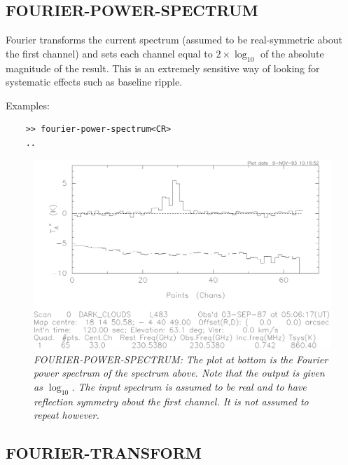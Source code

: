 \documentclass[11pt,twoside]{report}
\begin{document}
\subsection{FOURIER-POWER-SPECTRUM} 

Fourier transforms the current spectrum (assumed to be real-symmetric about
the first channel) and sets each channel equal to $2\times\log_{10}$ of the
absolute magnitude of the result. This is an extremely sensitive
way of looking for systematic effects such as baseline ripple.

Examples:
\begin{verbatim}
    >> fourier-power-spectrum<CR>
    ..
\end{verbatim}

\begin{figure}[htbp]
\begin{center}
\includegraphics[scale=0.65]{f-p-s.ps}
\protect\parbox{5.5in}
{\caption[FPS]
{\sl
FOURIER-POWER-SPECTRUM: The plot at bottom is the Fourier power spectrum of the
spectrum above. Note that the output is given as $\log_{10}$. The input
spectrum is assumed to be real and to have reflection symmetry about the first
channel. It is not assumed to repeat however.
\label{FPS}
}
}
\end{center}
\end{figure}

\subsection{FOURIER-TRANSFORM} 
\end{document}
